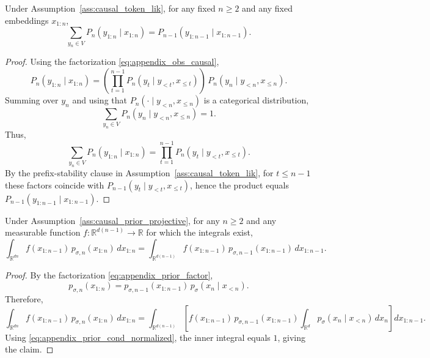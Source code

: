 \documentclass[11pt]{article}
\begin{document}

\begin{lemma}
\label{lem:sum_out_last_token}
Under Assumption~\ref{ass:causal_token_lik}, for any fixed $n\ge 2$ and any fixed embeddings $x_{1:n}$,
\begin{equation}
\sum_{y_n\in V} P_n(y_{1:n}\mid x_{1:n})
=
P_{n-1}(y_{1:n-1}\mid x_{1:n-1}).
\label{eq:appendix_sum_out_last_token}
\end{equation}
\end{lemma}

\begin{proof}
Using the factorization \eqref{eq:appendix_obs_causal},
\[
P_n(y_{1:n}\mid x_{1:n})
=
\left(\prod_{t=1}^{n-1} P_n(y_t\mid y_{<t},x_{\le t})\right)\,P_n(y_n\mid y_{<n},x_{\le n}).
\]
Summing over $y_n$ and using that $P_n(\cdot\mid y_{<n},x_{\le n})$ is a categorical distribution,
\[
\sum_{y_n\in V} P_n(y_n\mid y_{<n},x_{\le n}) = 1.
\]
Thus,
\[
\sum_{y_n\in V} P_n(y_{1:n}\mid x_{1:n})
=
\prod_{t=1}^{n-1} P_n(y_t\mid y_{<t},x_{\le t}).
\]
By the prefix-stability clause in Assumption~\ref{ass:causal_token_lik}, for $t\le n-1$ these factors coincide with
$P_{n-1}(y_t\mid y_{<t},x_{\le t})$, hence the product equals $P_{n-1}(y_{1:n-1}\mid x_{1:n-1})$.
\end{proof}


\begin{lemma}
\label{lem:integrate_out_last_latent}
Under Assumption~\ref{ass:causal_prior_projective}, for any $n\ge 2$ and any measurable function
$f:\mathbb R^{d(n-1)}\to\mathbb R$ for which the integrals exist,
\begin{equation}
\int_{\mathbb R^{dn}} f(x_{1:n-1})\,p_{\sigma,n}(x_{1:n})\,dx_{1:n}
=
\int_{\mathbb R^{d(n-1)}} f(x_{1:n-1})\,p_{\sigma,n-1}(x_{1:n-1})\,dx_{1:n-1}.
\label{eq:appendix_integrate_out_last_latent}
\end{equation}
\end{lemma}

\begin{proof}
By the factorization \eqref{eq:appendix_prior_factor},
\[
p_{\sigma,n}(x_{1:n})
=
p_{\sigma,n-1}(x_{1:n-1})\,p_\sigma(x_n\mid x_{<n}).
\]
Therefore,
\[
\int_{\mathbb R^{dn}} f(x_{1:n-1})\,p_{\sigma,n}(x_{1:n})\,dx_{1:n}
=
\int_{\mathbb R^{d(n-1)}}\!\!\left[
f(x_{1:n-1})\,p_{\sigma,n-1}(x_{1:n-1})
\int_{\mathbb R^d} p_\sigma(x_n\mid x_{<n})\,dx_n
\right]dx_{1:n-1}.
\]
Using \eqref{eq:appendix_prior_cond_normalized}, the inner integral equals $1$, giving the claim.
\end{proof}
\end{document}
